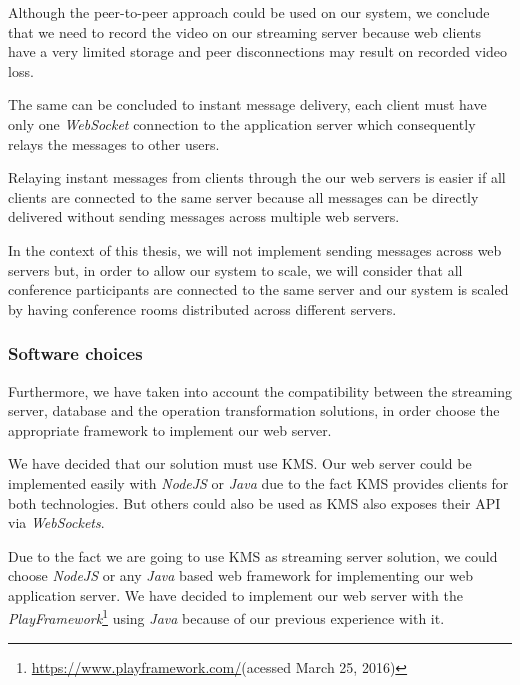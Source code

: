 \documentclass[10pt,conference]{IEEEtran}
\begin{document}
	Although the peer-to-peer approach could be used on our system, we conclude that we need to record the video on our streaming server because web clients have a very limited storage and peer disconnections may result on recorded video loss. 

	The same can be concluded to instant message delivery, each client must have only one \emph{WebSocket} connection to the application server which consequently relays the messages to other users.

	Relaying instant messages from clients through the our web servers is easier if all clients are connected to the same server because all messages can be directly delivered without sending messages across multiple web servers. 

	In the context of this thesis, we will not implement sending messages across web servers but, in order to allow our system to scale, we will consider that all conference participants are connected to the same server and our system is scaled by having conference rooms distributed across different servers.

\subsubsection{Software choices}

Furthermore, we have taken into account the compatibility between the streaming server, database and the operation transformation solutions, in order choose the appropriate framework to implement our web server.

We have decided that our solution must use \gls{KMS}. Our web server could be implemented easily with \emph{NodeJS} or \emph{Java} due to the fact \gls{KMS} provides clients for both technologies. But others could also be used as \gls{KMS} also exposes their \gls{API} via \emph{WebSockets}.

Due to the fact we are going to use \gls{KMS} as streaming server solution, we could choose \emph{NodeJS} or any \emph{Java} based web framework for implementing our web application server. We have decided to implement our web server with the \emph{PlayFramework}\footnote{\url{https://www.playframework.com/}(acessed March 25, 2016)} using \emph{Java} because of our previous experience with it.
\end{document}
